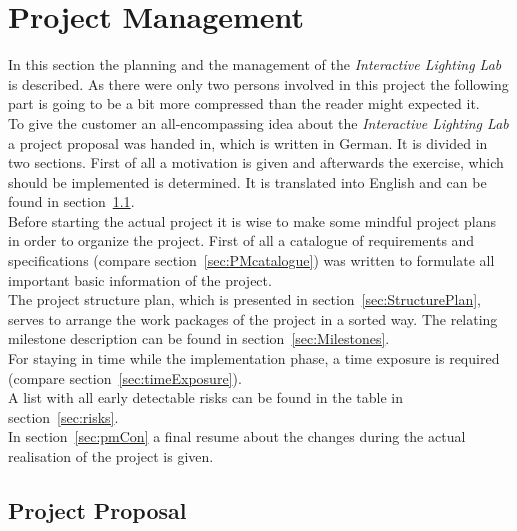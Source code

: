 \section{Project Management} \label{sec:pm}
In this section the planning and the management of the \textit{Interactive Lighting Lab} is described. As there were only two persons involved in this project the following part is going to be a bit more compressed than the reader might expected it.\\
To give the customer an all-encompassing idea about the \textit{Interactive Lighting Lab} a project proposal was handed in, which is written in German. It is divided in two sections. First of all a motivation is given and afterwards the exercise, which should be implemented is determined. It is translated into English and can be found in section~\ref{sec:ProjectProposal}. \\ 
Before starting the actual project it is wise to make some mindful project plans in order to organize the project. First of all a catalogue of requirements and specifications (compare section~\ref{sec:PMcatalogue}) was written to formulate all important basic information of the project. \\
The project structure plan, which is presented in section~\ref{sec:StructurePlan}, serves to arrange the work packages of the project in a sorted way. The relating milestone description can be found in section~\ref{sec:Milestones}. \\
For staying in time while the implementation phase, a time exposure is required (compare section~\ref{sec:timeExposure}).\\
A list with all early detectable risks can be found in the table in section~\ref{sec:risks}.\\
In section~\ref{sec:pmCon} a final resume about the changes during the actual realisation of the project is given. 


\subsection{Project Proposal}\label{sec:ProjectProposal}

